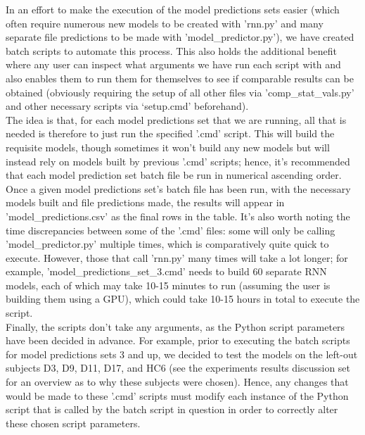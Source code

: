 \documentclass[12pt,twoside]{report}
\begin{document}
\quad In an effort to make the execution of the model predictions sets easier (which often require numerous new models to be created with 'rnn.py' and many separate file predictions to be made with 'model\_predictor.py'), we have created batch scripts to automate this process. This also holds the additional benefit where any user can inspect what arguments we have run each script with and also enables them to run them for themselves to see if comparable results can be obtained (obviously requiring the setup of all other files via 'comp\_stat\_vals.py' and other necessary scripts via ‘setup.cmd’ beforehand).\\

\quad The idea is that, for each model predictions set that we are running, all that is needed is therefore to just run the specified '.cmd' script. This will build the requisite models, though sometimes it won't build any new models but will instead rely on models built by previous '.cmd' scripts; hence, it's recommended that each model prediction set batch file be run in numerical ascending order. Once a given model predictions set’s batch file has been run, with the necessary models built and file predictions made, the results will appear in 'model\_predictions.csv' as the final rows in the table. It's also worth noting the time discrepancies between some of the '.cmd' files: some will only be calling 'model\_predictor.py' multiple times, which is comparatively quite quick to execute. However, those that call 'rnn.py' many times will take a lot longer; for example, 'model\_predictions\_set\_3.cmd' needs to build 60 separate RNN models, each of which may take 10-15 minutes to run (assuming the user is building them using a GPU), which could take 10-15 hours in total to execute the script.\\

\quad Finally, the scripts don't take any arguments, as the Python script parameters have been decided in advance. For example, prior to executing the batch scripts for model predictions sets 3 and up, we decided to test the models on the left-out subjects D3, D9, D11, D17, and HC6 (see the experiments results discussion set for an overview as to why these subjects were chosen). Hence, any changes that would be made to these '.cmd' scripts must modify each instance of the Python script that is called by the batch script in question in order to correctly alter these chosen script parameters.
\end{document}
